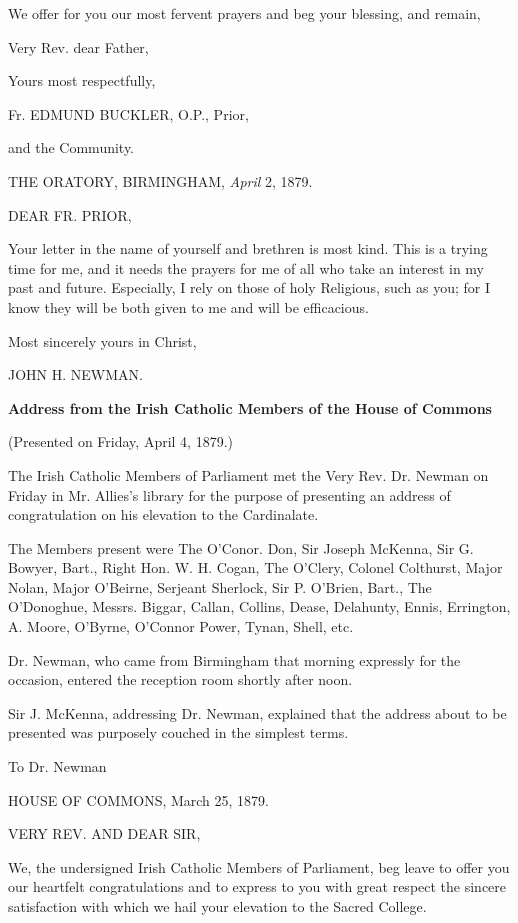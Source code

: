 We offer for you our most fervent prayers and beg your blessing,
and remain,

Very Rev. dear Father,

Yours most respectfully,

Fr. EDMUND BUCKLER, O.P.,
Prior,

and the Community.


THE ORATORY, BIRMINGHAM,
\emph{April} 2, 1879.

DEAR FR. PRIOR,

Your letter in the name of yourself and brethren is most kind. This is
a trying time for me, and it needs the prayers for me of all who take
an interest in my past and future. Especially, I rely on those of holy
Religious, such as you; for I know they will be both given to me and
will be efficacious.

Most sincerely yours in Christ,

JOHN H. NEWMAN.

\textbf{Address
from the Irish Catholic Members of the House of Commons}

(Presented on Friday, April 4, 1879.)

The Irish Catholic Members of Parliament met the Very Rev. Dr.
Newman on Friday in Mr. Allies's library for the purpose of presenting
an address of congratulation on his elevation to the Cardinalate.

The Members present were The O'Conor. Don, Sir Joseph McKenna, Sir
G. Bowyer, Bart., Right Hon. W. H. Cogan, The O'Clery, Colonel
Colthurst, Major Nolan, Major O'Beirne, Serjeant Sherlock, Sir P. O'Brien,
Bart., The O'Donoghue, Messrs. Biggar, Callan, Collins, Dease,
Delahunty, Ennis, Errington, A. Moore, O'Byrne, O'Connor Power, Tynan,
Shell, etc.

Dr. Newman, who came from Birmingham that morning expressly for the
occasion, entered the reception room shortly after noon.

Sir J. McKenna, addressing Dr. Newman, explained that the address
about to be presented was purposely couched in the simplest terms.

To Dr. Newman

HOUSE OF COMMONS,
March 25, 1879.

VERY REV. AND
DEAR SIR,

We, the undersigned Irish Catholic Members of Parliament, beg leave to
offer you our heartfelt congratulations and to express to you with
great respect the sincere satisfaction with which we hail your
elevation to the Sacred College.

